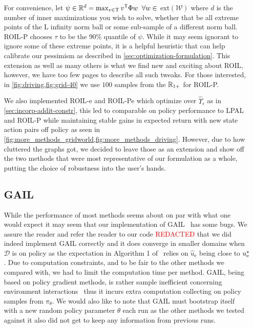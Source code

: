 For convenience, let $\psi \in \mathbb{R}^d = \max_{v \in \Upsilon} v^{\mathsf{T}}\Phi w \;\; \forall w \in$ ext$(\mathcal{W})$ where $d$ is the number of inner maximizations you wish to solve, whether that be all extreme points of the L infinity norm ball or some sub-sample of a different norm ball. ROIL-P chooses $\tau$ to be the 90\% quantile of $\psi$. While it may seem ignorant to ignore some of these extreme points, it is a helpful heuristic that can help calibrate our pessimism as described in \cref{sec:optimization-formulation}. This extension as well as many others is what we find new and exciting about ROIL, however, we have too few pages to describe all such tweaks. For those interested, in \cref{fig:driving,fig:grid-40} we use $100$ samples from the $\mathbb{R}_{1+}$ for ROIL-P.

We also implemented ROIL-e and ROIL-Pe which optimize over $\hat{\Upsilon}_\epsilon$ as in \cref{sec:incorp-addit-constr}, this led to comparable on policy performance to LPAL and ROIL-P while maintaining stable gains in expected return with new state action pairs off policy as seen in \cref{fig:more_methods_gridworld,fig:more_methods_driving}. However, due to how cluttered the graphs got, we decided to leave those as an extension and show off the two methods that were most representative of our formulation as a whole, putting the choice of robustness into the user's hands.

\subsection{GAIL}

While the performance of most methods seems about on par with what one would expect it may seem that our implementation of GAIL~\cite{Ho2016}
has some bugs. We assure the reader and refer the reader to our code \textcolor{red}{REDACTED} that we did indeed implement GAIL correctly and it does converge in smaller domains when $\mathcal{D}$ is on policy as the expectation in Algorithm 1 of~\cite{Ho2016} relies on $\hat{u}_{\mathrm{e}}$ being close to $u_{\mathrm{e}}^{\star}$. Due to computation constraints, and to be fair to the other methods we compared with, we had to limit the computation time per method. GAIL, being based on policy gradient methods, is rather sample inefficient concerning environment interactions~\cite[Section 7]{Ho2016} thus it incurs extra computation collecting on policy samples from $\pi_\theta$. We would also like to note that GAIL must bootstrap itself with a new random policy parameter $\theta$ each run as the other methods we tested against it also did not get to keep any information from previous runs.
    
